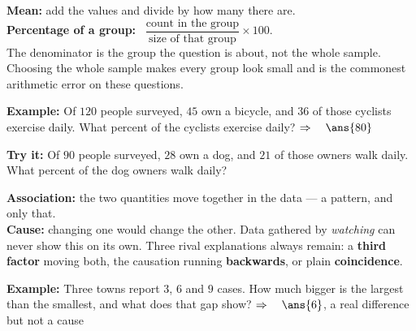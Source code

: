 \documentclass[12pt]{article}
\begin{document}


\begin{formulabox}
\textbf{Mean:} add the values and divide by how many there are.\\[3pt]
\textbf{Percentage of a group:} \ $\dfrac{\text{count in the group}}{\text{size of that group}} \times 100$.\\[3pt]
The denominator is the group the question is about, not the whole sample. Choosing the whole
sample makes every group look small and is the commonest arithmetic error on these questions.
\end{formulabox}

\begin{examplebox}
\textbf{Example:} \quad Of $120$ people surveyed, $45$ own a bicycle, and $36$ of those cyclists
exercise daily. What percent of the cyclists exercise daily?
$\Rightarrow\quad \ans{80}$
\end{examplebox}

\begin{tryitbox}
\textbf{Try it:} \quad Of $90$ people surveyed, $28$ own a dog, and $21$ of those owners walk
daily. What percent of the dog owners walk daily?\\[2pt]
\end{tryitbox}


\begin{formulabox}
\textbf{Association:} the two quantities move together in the data --- a pattern, and only that.\\[3pt]
\textbf{Cause:} changing one would change the other. Data gathered by \textit{watching} can never
show this on its own. Three rival explanations always remain: a \textbf{third factor} moving both,
the causation running \textbf{backwards}, or plain \textbf{coincidence}.
\end{formulabox}

\begin{examplebox}
\textbf{Example:} \quad Three towns report $3$, $6$ and $9$ cases. How much bigger is the largest
than the smallest, and what does that gap show?
$\Rightarrow\quad \ans{6}$, a real difference but not a cause
\end{examplebox}
\end{document}
